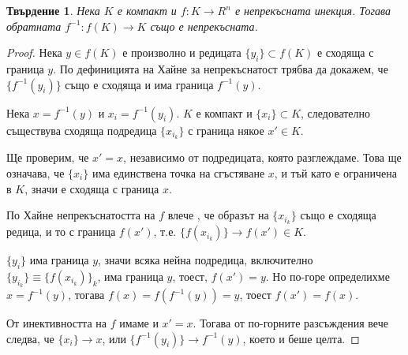 \documentclass{article}
\newtheorem*{proposition}{Твърдение}
\begin{document}
\begin{proposition}
    Нека $K$ е компакт и $f: K \to R^n$ е непрекъсната инекция. 
    Тогава обратната ${f^{-1}: f(K) \to K}$ също е непрекъсната.
\end{proposition}

\begin{proof}
    Нека $y \in f(K)$ е произволно и редицата $\{y_i\} \subset f(K)$ е сходяща с граница $y$. По дефиницията на Хайне за непрекъснатост трябва да докажем, че $\{f^{-1}(y_i)\}$ също е сходяща и има граница $f^{-1}(y)$.

    Нека $x = f^{-1}(y)$ и $x_i = f^{-1}(y_i)$. 
    $K$ е компакт и $\{x_i\} \subset K$, следователно съществува сходяща подредица $\{x_{i_k}\}$ с граница някое $x' \in K$. 

    Ще проверим, че $x' = x$, независимо от подредицата, която разглеждаме. 
    Това ще означава, че $\{x_i\}$ има единствена точка на сгъстяване $x$, и тъй като е ограничена в $K$, значи е сходяща с граница $x$.

    По Хайне непрекъснатостта на $f$ влече , че образът на $\{x_{i_k}\}$ също е сходяща редица, и то с граница $f(x')$,
    т.е. ${\{f(x_{i_k})\} \to f(x') \in K}$.

    $\{y_i\}$ има граница $y$, значи всяка нейна подредица, включително $\{y_{i_k}\} \equiv \{f(x_{i_k})\}_k$, има граница $y$, тоест, $f(x') = y$. 
    Но по-горе определихме $x = f^{-1}(y)$, тогава $f(x) = f(f^{-1}(y)) = y$, тоест ${f(x') = f(x)}$. 

    От инективността на $f$ имаме и $x' = x$. 
    Тогава от по-горните разсъждения вече следва, че $\{x_i\} \to x$, или ${\{f^{-1}(y_i)\} \to f^{-1}(y)}$, което и беше целта.
\end{proof}
\end{document}
